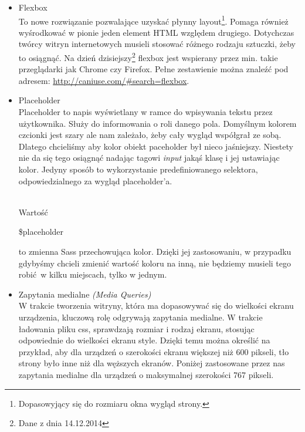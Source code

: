         \begin{itemize}
          \item Flexbox\\
            To nowe rozwiązanie pozwalające uzyskać płynny layout\footnote{Dopasowyjący się do rozmiaru okna wygląd strony.}. Pomaga również wyśrodkować w pionie jeden element HTML względem drugiego. Dotychczas twórcy witryn internetowych musieli stosować różnego rodzaju sztuczki, żeby to osiągnąć. Na dzień dzisiejszy\footnote{Dane z dnia 14.12.2014} flexbox jest wspierany przez min. takie przeglądarki jak Chrome czy Firefox. Pełne zestawienie można znaleźć pod adresem: \url{http://caniuse.com/\#search=flexbox}. \\
            

          \item Placeholder\\
            Placeholder to napis wyświetlany w ramce do wpisywania tekstu przez użytkownika. Służy do informowania o roli danego pola. Domyślnym kolorem czcionki jest szary ale nam zależało, żeby cały wygląd współgrał ze sobą. Dlatego chcieliśmy aby kolor obiekt paceholder był nieco jaśniejszy. Niestety nie da się tego osiągnąć nadając tagowi \emph{input} jakąś klasę i jej ustawiając kolor. Jedyny sposób to wykorzystanie predefiniowanego selektora, odpowiedzialnego za wygląd placeholder'a.

            \begin{code}
              
            \end{code}\\

            Wartość \begin{tt}\$placeholder\end{tt} to zmienna Sass przechowująca kolor. Dzięki jej zastosowaniu, w przypadku gdybyśmy chcieli zmienić wartość koloru na inną, nie będziemy musieli tego robić w kilku miejscach, tylko w jednym.

          \item Zapytania medialne \emph{(Media Queries)}\\ 
            W trakcie tworzenia witryny, która ma dopasowywać się do wielkości ekranu urządzenia, kluczową rolę odgrywają zapytania medialne. W trakcie ładowania pliku css, sprawdzają rozmiar i rodzaj ekranu, stosując odpowiednie do wielkości ekranu style. Dzięki temu można określić na przykład, aby dla urządzeń o szerokości ekranu większej niż 600 pikseli, tło strony było inne niż dla węższych ekranów.
            Poniżej zastosowane przez nas zapytania medialne dla urządzeń o maksymalnej szerokości 767 pikseli.
            \begin{code}
              
            \end{code}
        \end{itemize}
